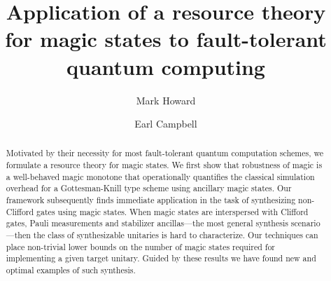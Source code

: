 \documentclass[aps,prl,twocolumn,showpacs,superscriptaddress,groupedaddress,amsmath,amssymb]{revtex4-1}  %
\begin{document}
\title{Application of a resource theory for magic states to fault-tolerant quantum computing}
\author{Mark Howard}
\author{Earl Campbell}


\begin{abstract}
Motivated by their necessity for most fault-tolerant quantum computation schemes, we formulate a resource theory for magic states.
We first show that robustness of magic is a well-behaved magic monotone that operationally quantifies the classical simulation overhead for a Gottesman-Knill type scheme using ancillary magic states.
Our framework subsequently finds immediate application in the task of synthesizing non-Clifford gates using magic states. When magic states are interspersed with Clifford gates, Pauli measurements and stabilizer ancillas---the most general synthesis scenario---then the class of synthesizable unitaries is hard to characterize. Our techniques can place non-trivial lower bounds on the number of magic states required for implementing a given target unitary. Guided by these results we have found new and optimal examples of such synthesis. 
\end{abstract}

\maketitle
\end{document}
